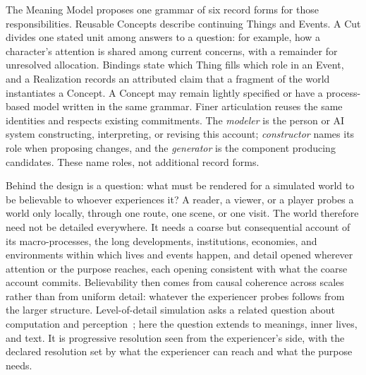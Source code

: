 \documentclass[11pt,a4paper]{article}
\begin{document}
The Meaning Model proposes one grammar of six record forms for those responsibilities. Reusable
Concepts describe continuing Things and Events. A Cut divides one stated unit
among answers to a question: for example, how a character's attention is shared
among current concerns, with a remainder for unresolved allocation. Bindings state
which Thing fills which role in an Event, and a Realization records an attributed
claim that a fragment of the world instantiates a Concept. A Concept
may remain lightly specified or have a process-based model written in the same
grammar. Finer articulation reuses the same identities and respects existing
commitments. The \emph{modeler} is the person or AI system constructing,
interpreting, or revising this account; \emph{constructor} names its role when
proposing changes, and the \emph{generator} is the component producing
candidates. These name roles, not additional record forms.

Behind the design is a question: what must be rendered for a simulated world to be
believable to whoever experiences it? A reader, a viewer, or a player probes a
world only locally, through one route, one scene, or one visit. The world
therefore need not be detailed everywhere. It needs a coarse but consequential
account of its macro-processes, the long developments, institutions, economies,
and environments within which lives and events happen, and detail opened
wherever attention or the purpose reaches, each opening consistent with what the
coarse account commits. Believability then comes from causal coherence across
scales rather than from uniform detail: whatever the experiencer probes follows
from the larger structure. Level-of-detail simulation asks a related question
about computation and perception~\cite{brom2007,sunshine2010}; here the question
extends to meanings, inner lives, and text. It is progressive resolution seen
from the experiencer's side, with the declared resolution set by what the
experiencer can reach and what the purpose needs.
\end{document}
